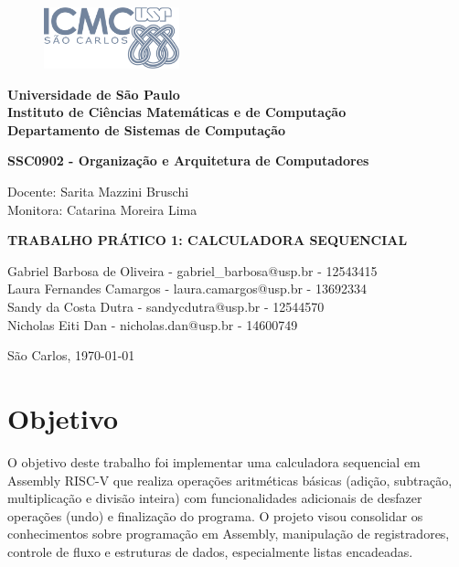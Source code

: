 \documentclass[12pt]{article}
\begin{document}
\thispagestyle{empty}

\begin{center}
	\begin{figure}[h]
		\centering
		\includegraphics[width=0.35\textwidth]{images/logo_icmc.png}
	\end{figure}
	{\large\textbf{Universidade de São Paulo}}\\[1mm]
	{\large\textbf{Instituto de Ciências Matemáticas e de Computação}}\\[1mm]
	{\large\textbf{Departamento de Sistemas de Computação}}

	\vfill
	\large \textbf{SSC0902 - Organização e Arquitetura de Computadores}
	\vfill

	{\large Docente: Sarita Mazzini Bruschi}\\
	{\large Monitora: Catarina Moreira Lima}\\
	\vfill

	{\large\MakeUppercase{\textbf{Trabalho Prático 1: Calculadora Sequencial}}}
	\vfill
\end{center}

\begin{center}
	Gabriel Barbosa de Oliveira - gabriel\_barbosa@usp.br - 12543415 \\
	Laura Fernandes Camargos - laura.camargos@usp.br - 13692334 \\
	Sandy da Costa Dutra - sandycdutra@usp.br - 12544570 \\
	Nicholas Eiti Dan - nicholas.dan@usp.br - 14600749 \\
\end{center}

\begin{center}
	São Carlos, \today
\end{center}

\newpage

\pagestyle{plain}

\section{Objetivo}
O objetivo deste trabalho foi implementar uma calculadora sequencial
em Assembly RISC-V que realiza operações aritméticas básicas (adição,
subtração, multiplicação e divisão inteira) com funcionalidades
adicionais de desfazer operações (undo) e finalização do programa. O
projeto visou consolidar os conhecimentos sobre programação em
Assembly, manipulação de registradores, controle de fluxo e
estruturas de dados, especialmente listas encadeadas.
\end{document}
